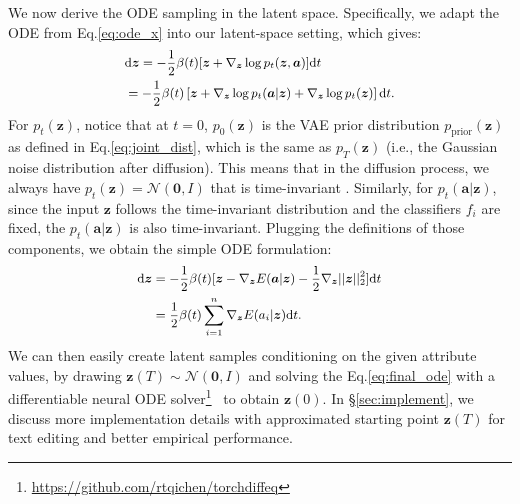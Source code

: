 \documentclass[11pt]{article}
\begin{document}
We now derive the ODE sampling in the latent space. Specifically, we adapt the ODE from Eq.\eqref{eq:ode_x} into our latent-space setting, which gives:
\begin{equation}
\small
\setlength\abovedisplayskip{0.2cm}
\setlength\belowdisplayskip{0.2cm}
    \label{eq:ode_z}
    \begin{split}
        &\text{d}\bm z=-\frac{1}{2}\beta(t)[\bm z+\nabla_{\bm z}\log p_t(\bm z,\bm a)]\text{d}t \\
        &=-\frac{1}{2}\beta(t)\left [\bm z +\nabla_{\bm z}\log p_t(\bm a|\bm z)  + \nabla_{\bm z}\log p_t(\bm z)  \right ] \text{d}t.
    \end{split}
\end{equation}
For $p_t(\bm z)$, notice that at $t=0$, $p_0(\bm{z})$ is the VAE prior distribution $p_{\text{prior}}(\bm z)$ as defined in Eq.\eqref{eq:joint_dist}, which is the same as $p_T(\bm{z})$ (i.e., the Gaussian noise distribution after diffusion). This means that in the diffusion process, we always have $p_t(\bm{z})=\mathcal{N}(\bm 0,I)$ that is time-invariant \citep{nie2021controllable}. Similarly, for $p_t(\bm{a} | \bm{z})$, since the input $\bm{z}$ follows the time-invariant distribution and the classifiers $f_i$ are fixed, the $p_t(\bm a|\bm z)$ is also time-invariant. Plugging the definitions of those components, we obtain the simple ODE formulation:
\begin{equation}
\small
\setlength\abovedisplayskip{0.2cm}
\setlength\belowdisplayskip{0.1cm}
\label{eq:final_ode}
\begin{split}
    \text d\bm z&=-\frac{1}{2}\beta(t)[\bm z-\nabla_{\bm z} E (\bm a|\bm z)- \frac{1}{2}\nabla_{\bm z}||\bm z||^2_2]\text dt\\
    & = \frac{1}{2}\beta(t)\sum_{i=1}^n \nabla_{\bm z} E(a_i|\bm z) \text dt.
\end{split}
\end{equation}
We can then easily create latent samples conditioning on the given attribute values, by drawing $\bm{z}(T) \sim \mathcal{N}(\bm 0,I)$ and solving the Eq.\eqref{eq:final_ode} with a differentiable neural ODE solver\footnote{\url{https://github.com/rtqichen/torchdiffeq}}~\cite{chen2018neuralode,chen2021eventfn} to obtain $\bm{z}(0)$. In \S\ref{sec:implement}, we discuss more implementation details with approximated starting point $\bm{z}(T)$ for text editing and better empirical performance.
\end{document}
